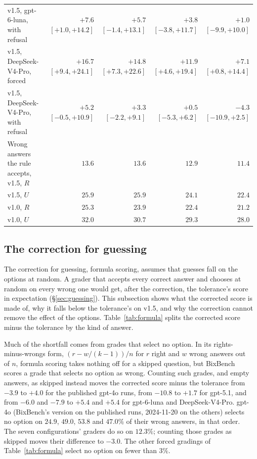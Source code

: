 \documentclass{article}
\begin{document}
\begin{table}[htbp]
{\begin{tabular}{lrrrr}
\quad v1.5, gpt-6-luna, with refusal & $+7.6$ {\scriptsize$[+1.0,+14.2]$} & $+5.7$ {\scriptsize$[-1.4,+13.1]$} & $+3.8$ {\scriptsize$[-3.8,+11.7]$} & $+1.0$ {\scriptsize$[-9.9,+10.0]$}\\
\quad v1.5, DeepSeek-V4-Pro, forced & $+16.7$ {\scriptsize$[+9.4,+24.1]$} & $+14.8$ {\scriptsize$[+7.3,+22.6]$} & $+11.9$ {\scriptsize$[+4.6,+19.4]$} & $+7.1$ {\scriptsize$[+0.8,+14.4]$}\\
\quad v1.5, DeepSeek-V4-Pro, with refusal & $+5.2$ {\scriptsize$[-0.5,+10.9]$} & $+3.3$ {\scriptsize$[-2.2,+9.1]$} & $+0.5$ {\scriptsize$[-5.3,+6.2]$} & $-4.3$ {\scriptsize$[-10.9,+2.5]$}\\
Wrong answers the rule accepts, v1.5, $R$ & $13.6$ & $13.6$ & $12.9$ & $11.4$\\
\quad v1.5, $U$ & $25.9$ & $25.9$ & $24.1$ & $22.4$\\
\quad v1.0, $R$ & $25.3$ & $23.9$ & $22.4$ & $21.2$\\
\quad v1.0, $U$ & $32.0$ & $30.7$ & $29.3$ & $28.0$\\
\bottomrule
\end{tabular}}
\end{table}

\subsection{The correction for guessing}
\label{app:guessing}

The correction for guessing, formula scoring, assumes that guesses fall on the options at random. A grader that
accepts every correct answer and chooses at random on every wrong one would get, after the correction, the tolerance's
score in expectation (\S\ref{sec:guessing}). This subsection shows what the corrected score is made of, why it falls
below the tolerance's on v1.5, and why the correction cannot remove the effect of the options. Table~\ref{tab:formula}
splits the corrected score minus the tolerance by the kind of answer.

Much of the shortfall comes from grades that select no option. In its rights-minus-wrongs form,
$(r-w/(k-1))/n$ for $r$ right and $w$ wrong answers out of $n$, formula scoring takes nothing off for a skipped
question, but BixBench scores a grade that selects no option as wrong. Counting such grades, and empty answers,
as skipped instead moves the corrected score minus the tolerance from $-3.9$ to $+4.0$ for the published gpt-4o runs,
from $-10.8$ to $+1.7$ for gpt-5.1, and from $-6.0$ and $-7.9$ to $+5.4$ and $+5.4$ for gpt-6-luna and
DeepSeek-V4-Pro. gpt-4o (BixBench's version on the published runs, 2024-11-20 on the others) selects no option on $24.9$, $49.0$, $53.8$ and $47.0\%$
of their wrong answers, in that order. The seven configurations' graders do so on $12.3\%$; counting those grades as
skipped moves their difference to $-3.0$. The other forced gradings of Table~\ref{tab:formula} select no option on fewer
than $3\%$.
\end{document}

